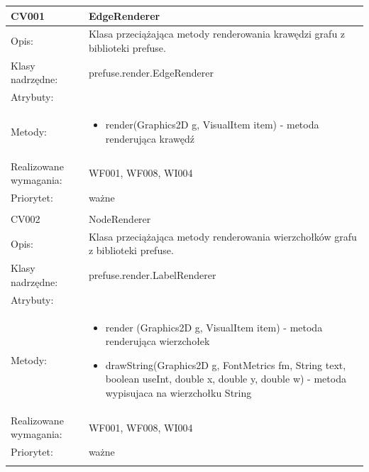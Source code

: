 \documentclass[a4paper,10pt]{article}
\begin{document}
\begin{center}
 

\begin{longtable}{|m{3cm}|m{9cm}|} \hline

CV001 & EdgeRenderer \\ \hline
Opis: & Klasa przeciążająca metody renderowania krawędzi grafu z biblioteki prefuse. \\ \hline
Klasy nadrzędne: &  prefuse.render.EdgeRenderer   \\ \hline
Atrybuty: & %
 \\ \hline
Metody: & \begin{itemize}
 \item render(Graphics2D g, VisualItem item) - metoda renderująca krawędź
\end{itemize}
  \\ \hline
Realizowane wymagania: & WF001, WF008, WI004 \\ \hline
Priorytet: & ważne  \\ \hline

\multicolumn{2}{c}{} \\
 \hline

CV002 & NodeRenderer \\ \hline
Opis: & Klasa przeciążająca metody renderowania wierzchołków grafu z biblioteki prefuse.    \\ \hline
Klasy nadrzędne: &  prefuse.render.LabelRenderer   \\ \hline
Atrybuty: & %
 \\ \hline
Metody: & \begin{itemize}
 \item render (Graphics2D g, VisualItem item) - metoda renderująca wierzchołek
\item drawString(Graphics2D g, FontMetrics fm, String text,
            boolean useInt, double x, double y, double w) - metoda wypisujaca na wierzchołku String
\end{itemize}
  \\ \hline
Realizowane wymagania: & WF001, WF008, WI004 \\ \hline
Priorytet: & ważne  \\ \hline

\multicolumn{2}{c}{} \\
 \hline


\end{longtable}
\end{center}
\end{document}
